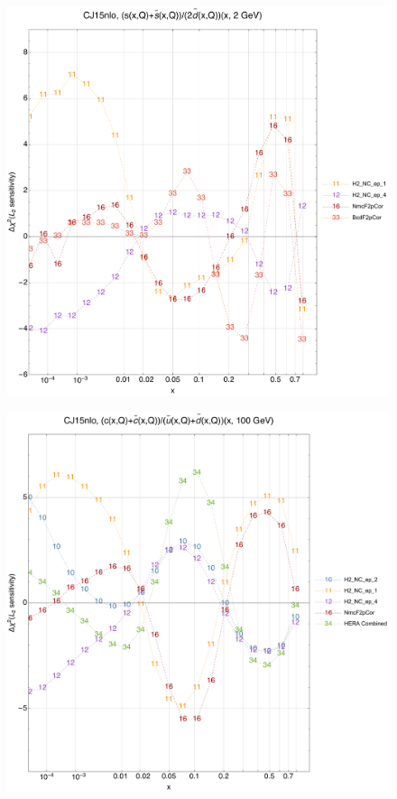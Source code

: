 \documentclass[10pt,aps,prd,floatfix,titlepage]{revtex4}
\begin{document}
\begin{figure}
\includegraphics[width=\textwidth,height=0.44\textheight,keepaspectratio]{2/rat_ifl6_CJ15nlo_L2_q2_Sf_2.pdf}
\caption{}
\end{figure}
\clearpage
\begin{figure}
\includegraphics[width=\textwidth,height=0.44\textheight,keepaspectratio]{2/rat_ifl7_CJ15nlo_L2_q100_Sf_2.pdf}
\caption{}
\end{figure}
\end{document}
